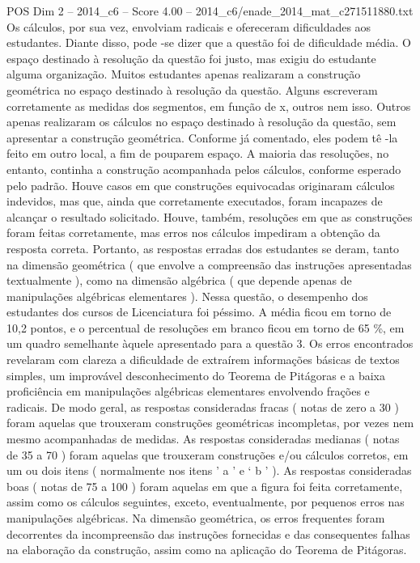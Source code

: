 \begin{textsample}{POS Dim 2 – 2014\_c6 – Score 4.00 – 2014\_c6/enade\_2014\_mat\_c271511880.txt}
Os cálculos, por sua vez, envolviam radicais e ofereceram dificuldades aos estudantes.
Diante disso, pode -se dizer que a questão foi de dificuldade média.
O espaço destinado à resolução da questão foi justo, mas exigiu do estudante alguma organização.
Muitos estudantes apenas realizaram a construção geométrica no espaço destinado à resolução da questão.
Alguns escreveram corretamente as medidas dos segmentos, em função de x, outros nem isso.
Outros apenas realizaram os cálculos no espaço destinado à resolução da questão, sem apresentar a construção geométrica.
Conforme já comentado, eles podem tê -la feito em outro local, a fim de pouparem espaço.
A maioria das resoluções, no entanto, continha a construção acompanhada pelos cálculos, conforme esperado pelo padrão.
Houve casos em que construções equivocadas originaram cálculos indevidos, mas que, ainda que corretamente executados, foram incapazes de alcançar o resultado solicitado.
Houve, também, resoluções em que as construções foram feitas corretamente, mas erros nos cálculos impediram a obtenção da resposta correta.
Portanto, as respostas erradas dos estudantes se deram, tanto na dimensão geométrica ( que envolve a compreensão das instruções apresentadas textualmente ), como na dimensão algébrica ( que depende apenas de manipulações algébricas elementares ).
Nessa questão, o desempenho dos estudantes dos cursos de Licenciatura foi péssimo.
A média ficou em torno de 10,2 pontos, e o percentual de resoluções em branco ficou em torno de 65 \%, em um quadro semelhante àquele apresentado para a questão 3.
Os erros encontrados revelaram com clareza a dificuldade de extraírem informações básicas de textos simples, um improvável desconhecimento do Teorema de Pitágoras e a baixa proficiência em manipulações algébricas elementares envolvendo frações e radicais.
De modo geral, as respostas consideradas fracas ( notas de zero a 30 ) foram aquelas que trouxeram construções geométricas incompletas, por vezes nem mesmo acompanhadas de medidas.
As respostas consideradas medianas ( notas de 35 a 70 ) foram aquelas que trouxeram construções e/ou cálculos corretos, em um ou dois itens ( normalmente nos itens ’ a ’ e ‘ b ’ ).
As respostas consideradas boas ( notas de 75 a 100 ) foram aquelas em que a figura foi feita corretamente, assim como os cálculos seguintes, exceto, eventualmente, por pequenos erros nas manipulações algébricas.
Na dimensão geométrica, os erros frequentes foram decorrentes da incompreensão das instruções fornecidas e das consequentes falhas na elaboração da construção, assim como na aplicação do Teorema de Pitágoras.

\end{textsample}
